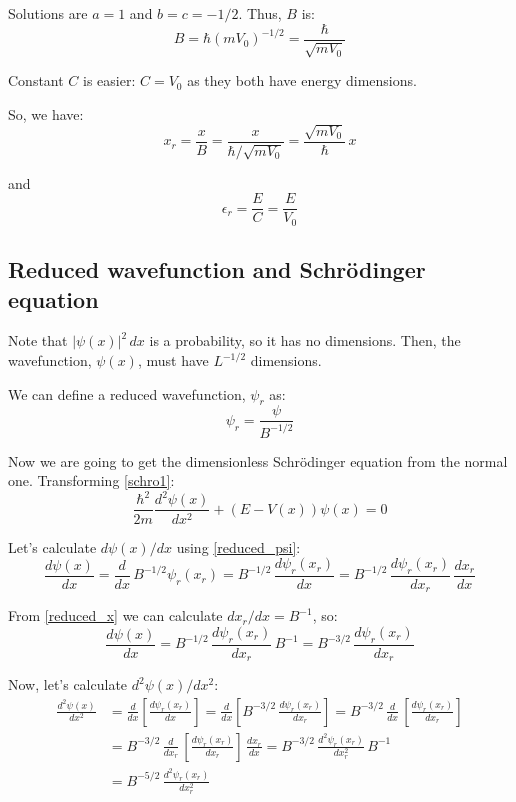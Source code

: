 Solutions are $a=1$ and $b=c=-1/2$. Thus, $B$ is:
\begin{equation}
B = \hbar (mV_0)^{-1/2} = \frac{\hbar}{\sqrt{mV_0}}
\end{equation}

Constant $C$ is easier: $C=V_0$ as they both have energy dimensions.

So, we have:
\begin{equation}
\label{reduced_x2}
x_r = \frac{x}{B}=\frac{x}{\hbar/\sqrt{mV_0}} = \frac{\sqrt{mV_0}}{\hbar}\,x
\end{equation}

and
\begin{equation}
\label{reduced_e2}
\epsilon_r = \frac{E}{C}=\frac{E}{V_0}
\end{equation}

\subsection{Reduced wavefunction and Schrödinger equation}
Note that $|\psi(x)|^2\,dx$ is a probability, so it has no dimensions. Then,
the wavefunction, $\psi(x)$, must have $L^{-1/2}$ dimensions.

We can define a reduced wavefunction, $\psi_r$ as:
\begin{equation}
\label{reduced_psi}
\psi_r = \frac{\psi}{B^{-1/2}}
\end{equation}

Now we are going to get the dimensionless Schrödinger equation from the
normal one. Transforming \ref{schro1}:
\begin{equation}
\label{schro2}
\frac{\hbar^2}{2m}\frac{d^2\psi(x)}{dx^2} + (E-V(x))\psi(x) = 0
\end{equation}

Let's calculate $d\psi(x)/dx$ using \ref{reduced_psi}:
\[
\frac{d\psi(x)}{dx}
= \frac{d}{dx}\, B^{-1/2}\psi_r(x_r)
= B^{-1/2}\,\frac{d\psi_r(x_r)}{dx}
= B^{-1/2}\,\frac{d\psi_r(x_r)}{dx_r}\,\frac{dx_r}{dx}
\]

From \ref{reduced_x} we can calculate $dx_r/dx=B^{-1}$, so:
\[
\frac{d\psi(x)}{dx}
= B^{-1/2}\,\frac{d\psi_r(x_r)}{dx_r}\,B^{-1}
= B^{-3/2}\,\frac{d\psi_r(x_r)}{dx_r}
\]

Now, let's calculate $d^2\psi(x)/dx^2$:
\begin{align*}
\frac{d^2\psi(x)}{dx^2}
&= \frac{d}{dx}\left[\frac{d\psi_r(x_r)}{dx}\right]
= \frac{d}{dx}\left[B^{-3/2}\,\frac{d\psi_r(x_r)}{dx_r}\right]
= B^{-3/2}\,\frac{d}{dx}\,\left[\frac{d\psi_r(x_r)}{dx_r}\right]\\
&= B^{-3/2}\,\frac{d}{dx_r}\,\left[\frac{d\psi_r(x_r)}{dx_r}\right]
	\,\frac{dx_r}{dx}
= B^{-3/2}\,\frac{d^2\psi_r(x_r)}{dx_r^2} \,B^{-1}\\
&= B^{-5/2}\,\frac{d^2\psi_r(x_r)}{dx_r^2}
\end{align*}

